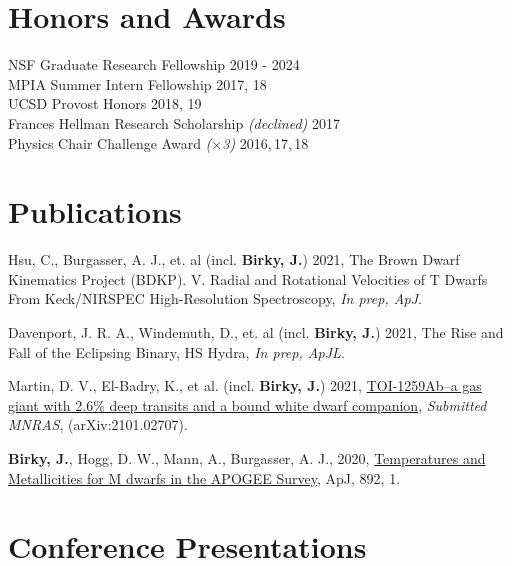 \documentclass[margin,line]{resume}
\begin{document}
\begin{resume}

\section{\mysidestyle \textcolor{bcolor}{Honors and Awards}}
NSF Graduate Research Fellowship \hfill 2019 - 2024 \\
MPIA Summer Intern Fellowship \hfill 2017, 18 \\
UCSD Provost Honors \hfill 2018, 19 \\
Frances Hellman Research Scholarship \textit{(declined)} \hfill 2017 \\
Physics Chair Challenge Award \textit{($\times$3)} \hfill 2016,\,17,\,18 


\section{\mysidestyle \textcolor{bcolor}{Publications}}

Hsu, C., Burgasser, A. J., et. al (incl. \textbf{Birky, J.}) 2021, \color{bcolor}The Brown Dwarf Kinematics Project (BDKP). V. Radial and Rotational Velocities of T Dwarfs From Keck/NIRSPEC High-Resolution Spectroscopy\color{black}, \textit{In prep, ApJ}.

Davenport, J. R. A., Windemuth, D., et. al (incl. \textbf{Birky, J.}) 2021, \color{bcolor}The Rise and Fall of the Eclipsing Binary, HS Hydra\color{black}, \textit{In prep, ApJL}.

Martin, D. V., El-Badry, K., et al. (incl. \textbf{Birky, J.}) 2021, \href{https://arxiv.org/abs/2101.02707}{TOI-1259Ab--a gas giant with 2.6\% deep transits and a bound white dwarf companion}, \textit{Submitted MNRAS}, (arXiv:2101.02707). 

\textbf{Birky, J.}, Hogg, D. W., Mann, A., Burgasser, A. J., 2020, \href{https://iopscience.iop.org/article/10.3847/1538-4357/ab7004}{Temperatures and Metallicities for M dwarfs in the APOGEE Survey}, ApJ, 892, 1. 


\section{\mysidestyle \textcolor{bcolor}{Conference Presentations}}


\end{resume}
\end{document}
